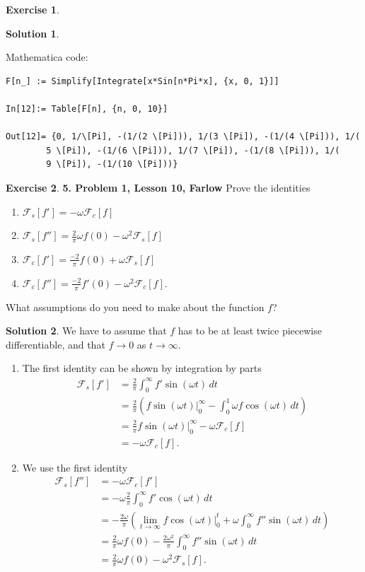 \documentclass{book}
\theoremstyle{definition}
\newtheorem*{exer*}{Exercise}
\newtheorem*{sln*}{Solution}
\newcommand{\F}{\mathcal{F}}
\begin{document}
\begin{exer*}
\begin{sln*}
\begin{enumerate}
			Mathematica code:
			\begin{lstlisting}
F[n_] := Simplify[Integrate[x*Sin[n*Pi*x], {x, 0, 1}]]
			
In[12]:= Table[F[n], {n, 0, 10}]
			
Out[12]= {0, 1/\[Pi], -(1/(2 \[Pi])), 1/(3 \[Pi]), -(1/(4 \[Pi])), 1/(
		5 \[Pi]), -(1/(6 \[Pi])), 1/(7 \[Pi]), -(1/(8 \[Pi])), 1/(
		9 \[Pi]), -(1/(10 \[Pi]))}
			\end{lstlisting}
		\end{enumerate}
	\end{sln*}
\end{exer*}





\newpage

\begin{exer*}\textbf{5. Problem 1, Lesson 10, Farlow}
	Prove the identities
	\begin{enumerate}
		\item $\F_s[f'] = -\omega \F_c[f]$\\
		\item $\F_s[f''] = \frac{2}{\pi}\omega f(0) - \omega^2 \F_s[f]$\\
		\item $\F_c[f'] = \frac{-2}{\pi}f(0) + \omega\F_s[f]$\\
		\item $\F_c[f''] = \frac{-2}{\pi}f'(0) - \omega^2 \F_c[f]$.
	\end{enumerate}
	What assumptions do you need to make about the function $f$?
\begin{sln*}
	We have to assume that $f$ has to be at least twice piecewise differentiable, and that $f\to 0$ as $t\to \infty$.   
	\begin{enumerate}
		\item The first identity can be shown by integration by parts
		\begin{align*}
		\F_s[f'] &= \frac{2}{\pi}\int^\infty_0 f'\sin(\omega t)\,dt\\
		&= \frac{2}{\pi}\left( f\sin(\omega t)\bigg\vert^\infty_0 - \int^1_0 \omega f\cos(\omega t)\,dt \right)\\
		&= \frac{2}{\pi}f\sin(\omega t)\bigg\vert_0^\infty - \omega \F_c[f]\\
		&= -\omega \F_c[f].
		\end{align*}
		
		
		\item We use the first identity
		\begin{align*}
		 \F_s[f''] &= -\omega\F_c[f']\\
		 &= -\omega \frac{2}{\pi}\int^\infty_0 f'\cos(\omega t)\,dt\\
		 &= -\frac{2\omega}{\pi}\left( \lim_{t\to \infty} f\cos(\omega t)\bigg\vert^t_0 + \omega \int^\infty_0  f'' \sin(\omega t)\,dt  \right)\\
		 &= \frac{2}{\pi}\omega f(0) - \frac{2\omega^2}{\pi}\int^\infty_0 f''\sin(\omega t)\,dt\\
		 &= \frac{2}{\pi}\omega f(0) - \omega^2 \F_s[f].
		\end{align*}
		

\end{enumerate}
\end{sln*}
\end{exer*}
\end{document}
